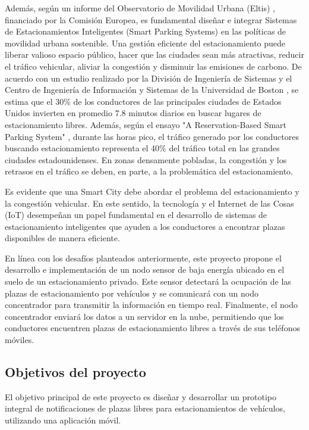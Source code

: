 Además, según un informe del Observatorio de Movilidad Urbana (Eltis) \cite{ref2}, financiado por la Comisión Europea, es fundamental diseñar e integrar Sistemas de Estacionamientos Inteligentes (Smart Parking Systems) en las políticas de movilidad urbana sostenible. Una gestión eficiente del estacionamiento puede liberar valioso espacio público, hacer que las ciudades sean más atractivas, reducir el tráfico vehicular, aliviar la congestión y disminuir las emisiones de carbono. De acuerdo con un estudio realizado por la División de Ingeniería de Sistemas y el Centro de Ingeniería de Información y Sistemas de la Universidad de Boston \cite{ref3}, se estima que el 30\% de los conductores de las principales ciudades de Estados Unidos invierten en promedio 7.8 minutos diarios en buscar lugares de estacionamiento libres. Además, según el ensayo "A Reservation-Based Smart Parking System" \cite{ref4}, durante las horas pico, el tráfico generado por los conductores buscando estacionamiento representa el 40\% del tráfico total en las grandes ciudades estadounidenses. En zonas densamente pobladas, la congestión y los retrasos en el tráfico se deben, en parte, a la problemática del estacionamiento.

Es evidente que una Smart City debe abordar el problema del estacionamiento y la congestión vehicular. En este sentido, la tecnología y el Internet de las Cosas (IoT) desempeñan un papel fundamental en el desarrollo de sistemas de estacionamiento inteligentes que ayuden a los conductores a encontrar plazas disponibles de manera eficiente.

En línea con los desafíos planteados anteriormente, este proyecto propone el desarrollo e implementación de un nodo sensor de baja energía ubicado en el suelo de un estacionamiento privado. Este sensor detectará la ocupación de las plazas de estacionamiento por vehículos y se comunicará con un nodo concentrador para transmitir la información en tiempo real. Finalmente, el nodo concentrador enviará los datos a un servidor en la nube, permitiendo que los conductores encuentren plazas de estacionamiento libres a través de sus teléfonos móviles.

\subsection{Objetivos del proyecto}
El objetivo principal de este proyecto es diseñar y desarrollar un prototipo integral de notificaciones de plazas libres para estacionamientos de vehículos, utilizando una aplicación móvil.

